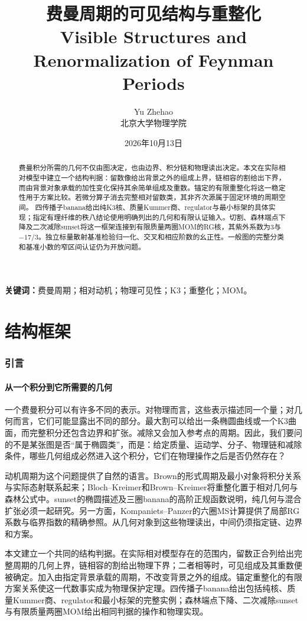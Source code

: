 \documentclass[11pt,a4paper,oneside]{ctexart}
\title{费曼周期的可见结构与重整化\\[5pt]\large Visible Structures and Renormalization of Feynman Periods}
\author{Yu Zhehao\\[4pt]\small 北京大学物理学院}
\date{2026年10月13日}
\theoremstyle{cnplain}
\theoremstyle{definition}
\theoremstyle{remark}
\numberwithin{equation}{section}
\begin{document}
\maketitle
\begin{abstract}
费曼积分所需的几何不仅由图决定，也由边界、积分链和物理读出决定。本文在实际相对模型中建立一个结构判据：留数像给出背景之外的组成上界，链相容的割给出下界，而由背景对象承载的加性变化保持其余简单组成及重数。锚定的有限重整化将这一稳定性用于方案比较。若微分算子消去完整相对留数类，其非齐次源属于固定环境的周期空间。
四传播子banana给出纯K3核、质量Kummer商、regulator与最小标架的具体实现；指定有理纤维的秩八结论使用明确列出的几何和有限认证输入。切割、森林端点下降及二次减除sunset将这一框架连接到有限质量两圈MOM的RG核，其紫外系数为$3$与$-17/3$。独立标量散射基准检验归一化、交叉和相应阶数的幺正性。一般图的完整分类和基准小数的窄区间认证仍为开放问题。
\end{abstract}
\noindent\textbf{关键词：}费曼周期；相对动机；物理可见性；K3；重整化；MOM。

\tableofcontents


\part{结构框架}
\section{引言}\label{ch:intro}
\subsection{从一个积分到它所需要的几何}
一个费曼积分可以有许多不同的表示。对物理而言，这些表示描述同一个量；对几何而言，它们可能显露出不同的部分。最大割可以给出一条椭圆曲线或一个K3曲面，而完整积分还包含边界和扩张。减除又会加入参考点的周期。因此，我们要问的不是某张图是否“属于椭圆类”，而是：给定质量、运动学、分子、物理链和减除条件，哪些几何组成必然进入这个积分，它们在物理操作之后是否仍然存在？

动机周期为这个问题提供了自然的语言。Brown的形式周期及最小对象将积分关系与实际态射联系起来\cite{brownperiods,browncosmic}；Bloch--Kreimer和Brown--Kreimer将重整化置于相对几何与森林公式中\cite{bk2008,bk2011,bk2012}。sunset的椭圆描述及三圈banana的高阶正规函数说明，纯几何与混合扩张必须一起研究\cite{bv,bkv}。另一方面，Kompaniets--Panzer的六圈MS计算提供了局部RG系数与临界指数的精确参照\cite{kp}。从几何对象到这些物理读出，中间仍须指定链、边界和方案。

本文建立一个共同的结构判据。在实际相对模型存在的范围内，留数正合列给出完整周期的几何上界，链相容的割给出物理下界；二者相等时，可见组成及其重数便被确定。加入由指定背景承载的周期，不改变背景之外的组成。锚定重整化的有限方案关系使这一代数事实成为物理保护定理。四传播子banana给出包括纯核、质量Kummer商、regulator和最小标架的完整实例；森林端点下降、二次减除sunset与有限质量两圈MOM给出相同判据的操作和物理实现。
\end{document}
